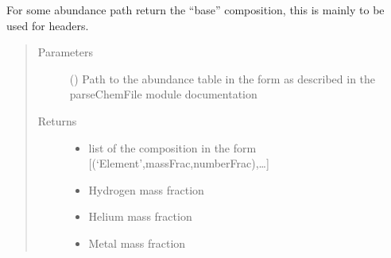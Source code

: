 \documentclass[letterpaper,10pt,english]{sphinxmanual}
\begin{document}
\begin{fulllineitems}
\label{\detokenize{pyTOPSScrape.ext:pyTOPSScrape.ext.utils.get_base_composition}}
\sphinxAtStartPar
For some abundance path return the “base” composition, this is mainly to be
used for headers.
\begin{quote}\begin{description}
\item[{Parameters}] \leavevmode
\sphinxAtStartPar
{} () \textendash{} Path to the abundance table in the form as described in the
parseChemFile module documentation

\item[{Returns}] \leavevmode
\sphinxAtStartPar
\begin{itemize}
\item {} 
\sphinxAtStartPar
{} \textendash{} list of the composition in the form {[}(‘Element’,massFrac,numberFrac),…{]}

\item {} 
\sphinxAtStartPar
{} \textendash{} Hydrogen mass fraction

\item {} 
\sphinxAtStartPar
{} \textendash{} Helium mass fraction

\item {} 
\sphinxAtStartPar
{} \textendash{} Metal mass fraction

\end{itemize}


\end{description}\end{quote}

\end{fulllineitems}

\end{document}
